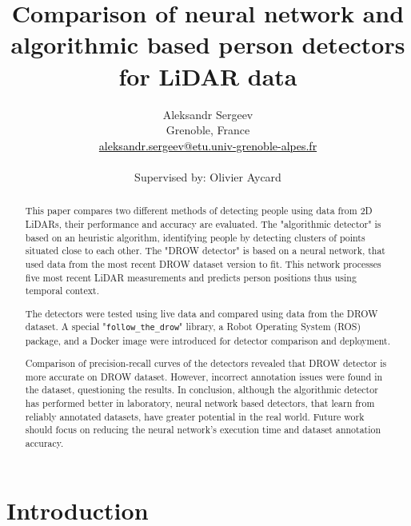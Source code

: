 \documentclass{article}
\title{
    Comparison of neural network and algorithmic based person detectors for LiDAR data
}
\author{
    Aleksandr Sergeev \\ 
    Grenoble, France \\
    \href{mailto:aleksandr.sergeev@etu.univ-grenoble-alpes.fr}{\textcolor{black}{aleksandr.sergeev@etu.univ-grenoble-alpes.fr}} \\
    \\
    Supervised by: Olivier Aycard
}
\begin{document}

\parbox[b]{\linewidth}{}

\begin{abstract}
    This paper compares two different methods of detecting people using data from 2D LiDARs, their performance and accuracy are evaluated.
    The "algorithmic detector" is based on an heuristic algorithm, identifying people by detecting clusters of points situated close to each other.
    The "DROW detector" is based on a neural network, that used data from the most recent DROW dataset version to fit.
    This network processes five most recent LiDAR measurements and predicts person positions thus using temporal context.

    The detectors were tested using live data and compared using data from the DROW dataset.
    A special "\texttt{follow\_the\_drow}" library, a Robot Operating System (ROS) package, and a Docker image were introduced for detector comparison and deployment.

    Comparison of precision-recall curves of the detectors revealed that DROW detector is more accurate on DROW dataset.
    However, incorrect annotation issues were found in the dataset, questioning the results.
    In conclusion, although the algorithmic detector has performed better in laboratory, neural network based detectors, that learn from reliably annotated datasets, have greater potential in the real world.
    Future work should focus on reducing the neural network's execution time and dataset annotation accuracy.
\end{abstract}

\section{Introduction}
\end{document}
